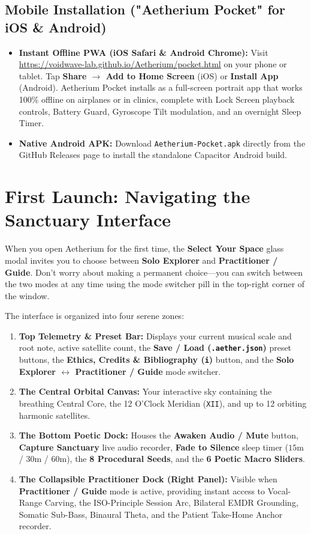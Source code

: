 \documentclass[11pt,oneside,openany]{book}
\begin{document}
\subsection{Mobile Installation ("Aetherium Pocket" for iOS \& Android)}
\begin{itemize}
  \item \textbf{Instant Offline PWA (iOS Safari \& Android Chrome):} Visit \url{https://voidwave-lab.github.io/Aetherium/pocket.html} on your phone or tablet. Tap \textbf{Share $\rightarrow$ Add to Home Screen} (iOS) or \textbf{Install App} (Android). Aetherium Pocket installs as a full-screen portrait app that works 100\% offline on airplanes or in clinics, complete with Lock Screen playback controls, Battery Guard, Gyroscope Tilt modulation, and an overnight Sleep Timer.
  \item \textbf{Native Android APK:} Download \texttt{Aetherium-Pocket.apk} directly from the GitHub Releases page to install the standalone Capacitor Android build.
\end{itemize}

\section{First Launch: Navigating the Sanctuary Interface}

When you open Aetherium for the first time, the \textbf{Select Your Space} glass modal invites you to choose between \textbf{Solo Explorer} and \textbf{Practitioner / Guide}. Don't worry about making a permanent choice---you can switch between the two modes at any time using the mode switcher pill in the top-right corner of the window.

The interface is organized into four serene zones:
\begin{enumerate}
  \item \textbf{Top Telemetry \& Preset Bar:} Displays your current musical scale and root note, active satellite count, the \textbf{Save / Load (\texttt{.aether.json})} preset buttons, the \textbf{Ethics, Credits \& Bibliography (\texttt{i})} button, and the \textbf{Solo Explorer $\leftrightarrow$ Practitioner / Guide} mode switcher.
  \item \textbf{The Central Orbital Canvas:} Your interactive sky containing the breathing Central Core, the 12 O'Clock Meridian (\texttt{XII}), and up to 12 orbiting harmonic satellites.
  \item \textbf{The Bottom Poetic Dock:} Houses the \textbf{Awaken Audio / Mute} button, \textbf{Capture Sanctuary} live audio recorder, \textbf{Fade to Silence} sleep timer ($15\text{m}$ / $30\text{m}$ / $60\text{m}$), the \textbf{8 Procedural Seeds}, and the \textbf{6 Poetic Macro Sliders}.
  \item \textbf{The Collapsible Practitioner Dock (Right Panel):} Visible when \textbf{Practitioner / Guide} mode is active, providing instant access to Vocal-Range Carving, the ISO-Principle Session Arc, Bilateral EMDR Grounding, Somatic Sub-Bass, Binaural Theta, and the Patient Take-Home Anchor recorder.
\end{enumerate}
\end{document}
